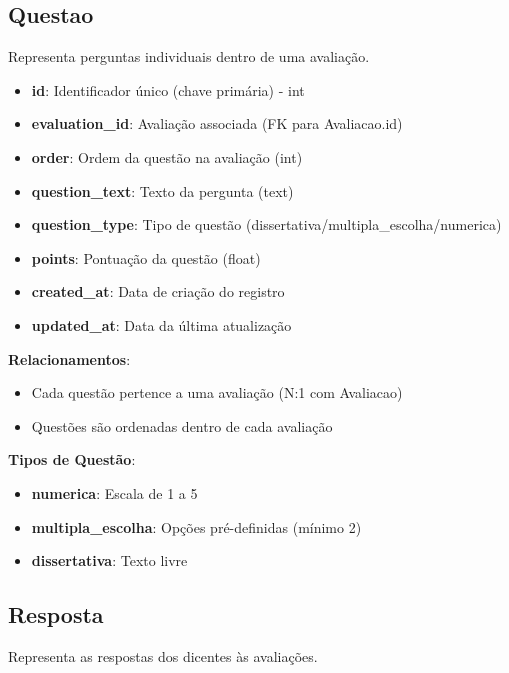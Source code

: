 \documentclass[a4paper,12pt]{article}
\begin{document}
\subsection{Questao}

Representa perguntas individuais dentro de uma avaliação.

\begin{itemize}
    \item \textbf{id}: Identificador único (chave primária) - int
    \item \textbf{evaluation\_id}: Avaliação associada (FK para Avaliacao.id)
    \item \textbf{order}: Ordem da questão na avaliação (int)
    \item \textbf{question\_text}: Texto da pergunta (text)
    \item \textbf{question\_type}: Tipo de questão (dissertativa/multipla\_escolha/numerica)
    \item \textbf{points}: Pontuação da questão (float)
    \item \textbf{created\_at}: Data de criação do registro
    \item \textbf{updated\_at}: Data da última atualização
\end{itemize}

\textbf{Relacionamentos}:
\begin{itemize}
    \item Cada questão pertence a uma avaliação (N:1 com Avaliacao)
    \item Questões são ordenadas dentro de cada avaliação
\end{itemize}

\textbf{Tipos de Questão}:
\begin{itemize}
    \item \textbf{numerica}: Escala de 1 a 5
    \item \textbf{multipla\_escolha}: Opções pré-definidas (mínimo 2)
    \item \textbf{dissertativa}: Texto livre
\end{itemize}

\subsection{Resposta}

Representa as respostas dos dicentes às avaliações.
\end{document}
